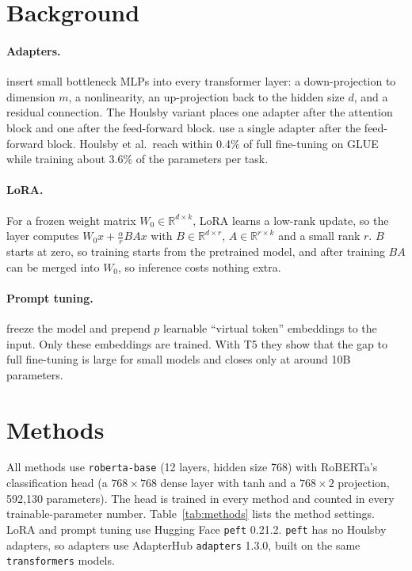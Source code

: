 \documentclass[11pt]{article}
\begin{document}
\section{Background}

\paragraph{Adapters.} \citet{houlsby2019} insert small bottleneck MLPs into every transformer layer: a down-projection to dimension $m$, a nonlinearity, an up-projection back to the hidden size $d$, and a residual connection. The Houlsby variant places one adapter after the attention block and one after the feed-forward block. \citet{pfeiffer2021} use a single adapter after the feed-forward block. Houlsby et al.\ reach within 0.4\% of full fine-tuning on GLUE while training about 3.6\% of the parameters per task.

\paragraph{LoRA.} For a frozen weight matrix $W_0 \in \mathbb{R}^{d\times k}$, LoRA \citep{hu2022} learns a low-rank update, so the layer computes $W_0x + \frac{\alpha}{r}BAx$ with $B \in \mathbb{R}^{d\times r}$, $A \in \mathbb{R}^{r\times k}$ and a small rank $r$. $B$ starts at zero, so training starts from the pretrained model, and after training $BA$ can be merged into $W_0$, so inference costs nothing extra.

\paragraph{Prompt tuning.} \citet{lester2021} freeze the model and prepend $p$ learnable ``virtual token'' embeddings to the input. Only these embeddings are trained. With T5 they show that the gap to full fine-tuning is large for small models and closes only at around 10B parameters.

\section{Methods}

All methods use \texttt{roberta-base} \citep{liu2019} (12 layers, hidden size 768) with RoBERTa's classification head (a $768{\times}768$ dense layer with tanh and a $768{\times}2$ projection, 592,130 parameters). The head is trained in every method and counted in every trainable-parameter number. Table~\ref{tab:methods} lists the method settings. LoRA and prompt tuning use Hugging Face \texttt{peft} 0.21.2. \texttt{peft} has no Houlsby adapters, so adapters use AdapterHub \texttt{adapters} 1.3.0, built on the same \texttt{transformers} models.
\end{document}

